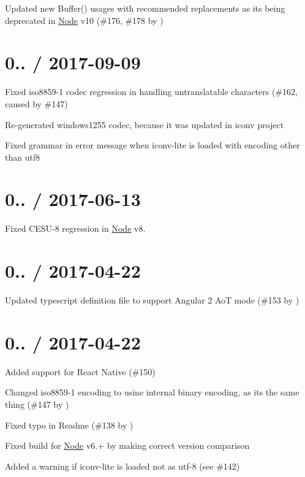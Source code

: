 \begin{DoxyItemize}
\item Updated {\ttfamily new Buffer()} usages with recommended replacements as it\textquotesingle{}s being deprecated in \mbox{\hyperlink{classNode}{Node}} v10 (\#176, \#178 by )
\end{DoxyItemize}

\section*{0.. / 2017-\/09-\/09}


\begin{DoxyItemize}
\item Fixed iso8859-\/1 codec regression in handling untranslatable characters (\#162, caused by \#147)
\item Re-\/generated windows1255 codec, because it was updated in iconv project
\item Fixed grammar in error message when iconv-\/lite is loaded with encoding other than utf8
\end{DoxyItemize}

\section*{0.. / 2017-\/06-\/13}


\begin{DoxyItemize}
\item Fixed C\+E\+S\+U-\/8 regression in \mbox{\hyperlink{classNode}{Node}} v8.
\end{DoxyItemize}

\section*{0.. / 2017-\/04-\/22}


\begin{DoxyItemize}
\item Updated typescript definition file to support Angular 2 AoT mode (\#153 by )
\end{DoxyItemize}

\section*{0.. / 2017-\/04-\/22}


\begin{DoxyItemize}
\item Added support for React Native (\#150)
\item Changed iso8859-\/1 encoding to usine internal \textquotesingle{}binary\textquotesingle{} encoding, as it\textquotesingle{}s the same thing (\#147 by )
\item Fixed typo in Readme (\#138 by )
\item Fixed build for \mbox{\hyperlink{classNode}{Node}} v6.+ by making correct version comparison
\item Added a warning if iconv-\/lite is loaded not as utf-\/8 (see \#142)
\end{DoxyItemize}

